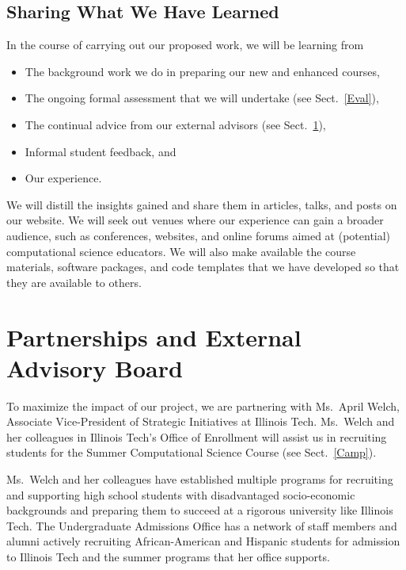 \documentclass[11pt]{NSFamsart}
\begin{document}
\subsection{Sharing What We Have Learned} \label{Publicize}
In the course of carrying out our proposed work, we will be learning from
\begin{itemize}
\item The background work we do in preparing our new and enhanced courses,
\item The ongoing formal assessment that we will undertake (see Sect.~\ref{Eval}),
\item The continual advice from our external advisors (see Sect.~\ref{PartnerSec}),
\item Informal student feedback, and
\item Our experience.
\end{itemize}
We will distill the insights gained and share them in articles, talks, and posts on our website.  We will seek out venues where our experience can gain a broader audience, such as conferences, websites, and online forums aimed at (potential) computational science educators.  We will also make available the course materials, software packages, and code templates that we have developed so that they are available to others.


\section{Partnerships and External Advisory Board} \label{PartnerSec}
To maximize the impact of our project, we are partnering with Ms.~April Welch, Associate Vice-President of Strategic Initiatives at Illinois Tech. Ms.~Welch and her colleagues in Illinois Tech's Office of Enrollment will assist us in recruiting students for the Summer Computational Science Course (see Sect.~\ref{Camp}).

Ms.~Welch and her colleagues have established multiple programs for recruiting and supporting high school students with disadvantaged socio-economic backgrounds and preparing them to succeed at a rigorous university like Illinois Tech. The Undergraduate Admissions Office has a network of staff members and alumni actively recruiting African-American and Hispanic students for admission to Illinois Tech and the summer programs that her office supports. 
\end{document}
